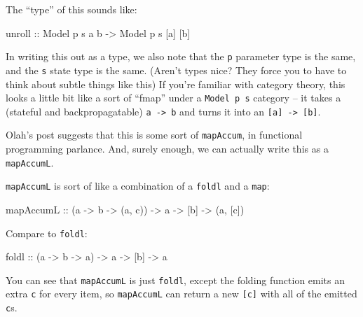 \documentclass[]{article}
\newenvironment{Shaded}{}{}
\newcommand{\DataTypeTok}[1]{\textcolor[rgb]{0.56,0.13,0.00}{#1}}
\newcommand{\NormalTok}[1]{#1}
\newcommand{\OtherTok}[1]{\textcolor[rgb]{0.00,0.44,0.13}{#1}}
\begin{document}
The ``type'' of this sounds like:

\begin{Shaded}
\begin{Highlighting}[]
\OtherTok{unroll ::} \DataTypeTok{Model}\NormalTok{ p s a b }\OtherTok{->} \DataTypeTok{Model}\NormalTok{ p s [a] [b]}
\end{Highlighting}
\end{Shaded}

In writing this out as a type, we also note that the \texttt{p} parameter type
is the same, and the \texttt{s} state type is the same. (Aren't types nice? They
force you to have to think about subtle things like this) If you're familiar
with category theory, this looks a little bit like a sort of ``fmap'' under a
\texttt{Model\ p\ s} category -- it takes a (stateful and backpropagatable)
\texttt{a\ -\textgreater{}\ b} and turns it into an
\texttt{{[}a{]}\ -\textgreater{}\ {[}b{]}}.

Olah's post suggests that this is some sort of \texttt{mapAccum}, in functional
programming parlance. And, surely enough, we can actually write this as a
\texttt{mapAccumL}.

\texttt{mapAccumL} is sort of like a combination of a \texttt{foldl} and a
\texttt{map}:

\begin{Shaded}
\begin{Highlighting}[]
\NormalTok{mapAccumL}
\OtherTok{    ::}\NormalTok{ (a }\OtherTok{->}\NormalTok{ b }\OtherTok{->}\NormalTok{ (a, c))}
    \OtherTok{->}\NormalTok{ a}
    \OtherTok{->}\NormalTok{ [b]}
    \OtherTok{->}\NormalTok{ (a, [c])}
\end{Highlighting}
\end{Shaded}

Compare to \texttt{foldl}:

\begin{Shaded}
\begin{Highlighting}[]
\NormalTok{foldl}
\OtherTok{    ::}\NormalTok{ (a }\OtherTok{->}\NormalTok{ b }\OtherTok{->}\NormalTok{ a)}
    \OtherTok{->}\NormalTok{ a}
    \OtherTok{->}\NormalTok{ [b]}
    \OtherTok{->}\NormalTok{ a}
\end{Highlighting}
\end{Shaded}

You can see that \texttt{mapAccumL} is just \texttt{foldl}, except the folding
function emits an extra \texttt{c} for every item, so \texttt{mapAccumL} can
return a new \texttt{{[}c{]}} with all of the emitted \texttt{c}s.
\end{document}
